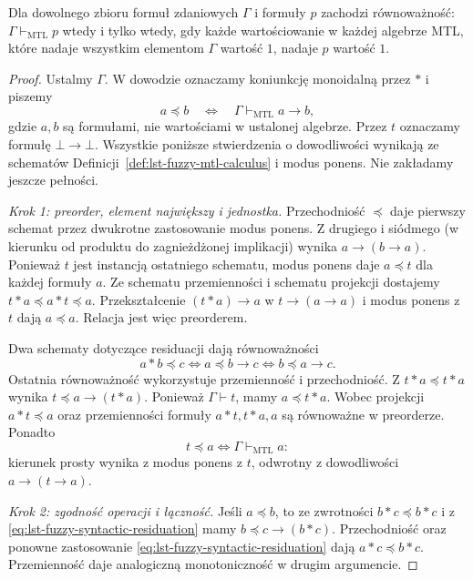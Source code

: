 \begin{twierdzenie}
\label{thm:lst-fuzzy-mtl-general-completeness}
Dla dowolnego zbioru formuł zdaniowych $\Gamma$ i formuły $p$
zachodzi równoważność: $\Gamma\vdash_{\mathrm{MTL}}p$ wtedy
i tylko wtedy, gdy każde wartościowanie w każdej algebrze
MTL, które nadaje wszystkim elementom $\Gamma$ wartość $1$,
nadaje $p$ wartość $1$.
\end{twierdzenie}
\begin{proof}
Ustalmy $\Gamma$. W dowodzie oznaczamy koniunkcję monoidalną
przez $*$ i piszemy
\[
 a\preccurlyeq b\quad\Longleftrightarrow\quad
 \Gamma\vdash_{\mathrm{MTL}}a\to b,
\]
gdzie $a,b$ są formułami, nie wartościami w ustalonej algebrze.
Przez $t$ oznaczamy formułę $\bot\to\bot$.
Wszystkie poniższe stwierdzenia o dowodliwości wynikają
ze schematów Definicji~\ref{def:lst-fuzzy-mtl-calculus}
i modus ponens. Nie zakładamy jeszcze pełności.

\emph{Krok 1: preorder, element największy i jednostka.}
Przechodniość $\preccurlyeq$ daje pierwszy schemat
przez dwukrotne zastosowanie modus ponens.
Z drugiego i siódmego (w kierunku od produktu do zagnieżdżonej
implikacji) wynika $a\to(b\to a)$.
Ponieważ $t$ jest instancją ostatniego schematu, modus ponens
daje $a\preccurlyeq t$ dla każdej formuły $a$.
Ze schematu przemienności i schematu projekcji dostajemy
$t*a\preccurlyeq a*t\preccurlyeq a$. Przekształcenie
$(t*a)\to a$ w $t\to(a\to a)$ i modus ponens z $t$
dają $a\preccurlyeq a$. Relacja jest więc preorderem.

Dwa schematy dotyczące residuacji dają równoważności
\begin{equation}\label{eq:lst-fuzzy-syntactic-residuation}
 a*b\preccurlyeq c
 \iff a\preccurlyeq b\to c
 \iff b\preccurlyeq a\to c.
\end{equation}
Ostatnia równoważność wykorzystuje przemienność i przechodniość.
Z $t*a\preccurlyeq t*a$ wynika $t\preccurlyeq a\to(t*a)$.
Ponieważ $\Gamma\vdash t$, mamy $a\preccurlyeq t*a$.
Wobec projekcji $a*t\preccurlyeq a$ oraz przemienności
formuły $a*t,t*a,a$ są równoważne w preorderze.
Ponadto
\[
 t\preccurlyeq a\iff\Gamma\vdash_{\mathrm{MTL}}a:
\]
kierunek prosty wynika z modus ponens z $t$, odwrotny
z dowodliwości $a\to(t\to a)$.

\emph{Krok 2: zgodność operacji i łączność.}
Jeśli $a\preccurlyeq b$, to ze zwrotności
$b*c\preccurlyeq b*c$ i z \eqref{eq:lst-fuzzy-syntactic-residuation}
mamy $b\preccurlyeq c\to(b*c)$. Przechodniość oraz ponowne
zastosowanie \eqref{eq:lst-fuzzy-syntactic-residuation}
dają $a*c\preccurlyeq b*c$. Przemienność daje analogiczną
monotoniczność w drugim argumencie.


\end{proof}
